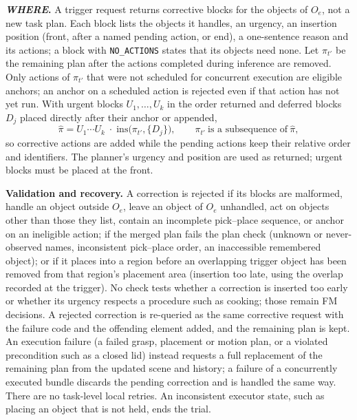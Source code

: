 \noindent\textbf{\textit{WHERE}.} A trigger request returns corrective blocks for the objects of $O_e$, not a
new task plan. Each block lists the objects it handles, an urgency, an insertion position (front, after a named
pending action, or end), a one-sentence reason and its actions; a block with \texttt{NO\_ACTIONS} states that
its objects need none. Let $\pi_{t'}$ be the remaining plan after the actions completed during inference are
removed. Only actions of $\pi_{t'}$ that were not scheduled for concurrent execution are eligible anchors; an
anchor on a scheduled action is rejected even if that action has not yet run. With urgent blocks
$U_1,\dots,U_k$ in the order returned and deferred blocks $D_j$ placed directly after their anchor or appended,
\begin{equation}
\widehat{\pi}=U_1\cdots U_k\;\cdot\;\mathrm{ins}\big(\pi_{t'},\{D_j\}\big),
\qquad \pi_{t'}\ \text{is a subsequence of}\ \widehat{\pi},
\label{eq:supp-merge}
\end{equation}
so corrective actions are added while the pending actions keep their relative order and identifiers. The
planner's urgency and position are used as returned; urgent blocks must be placed at the front.

\noindent\textbf{Validation and recovery.} A correction is rejected if its blocks are malformed, handle an
object outside $O_e$, leave an object of $O_e$ unhandled, act on objects other than those they list, contain an
incomplete pick--place sequence, or anchor on an ineligible action; if the merged plan fails the plan check
(unknown or never-observed names, inconsistent pick--place order, an inaccessible remembered object); or if it
places into a region before an overlapping trigger object has been removed from that region's placement area
(insertion too late, using the overlap recorded at the trigger). No check tests whether a correction is
inserted too early or whether its urgency respects a procedure such as cooking; those remain FM decisions. A
rejected correction is re-queried as the same corrective request with the failure code and the offending
element added, and the remaining plan is kept. An execution failure (a failed grasp, placement or motion plan,
or a violated precondition such as a closed lid) instead requests a full replacement of the remaining plan from
the updated scene and history; a failure of a concurrently executed bundle discards the pending correction and
is handled the same way. There are no task-level local retries. An inconsistent executor state, such as placing
an object that is not held, ends the trial.

